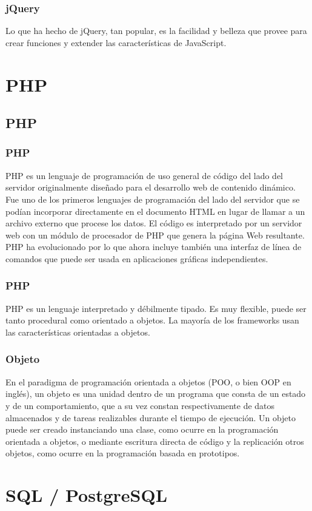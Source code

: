\documentclass[12pt]{beamer}
\begin{document}
\begin{frame}
 \frametitle{jQuery}
 Lo que ha hecho de jQuery, tan popular, es la facilidad y belleza que provee para crear funciones y extender las características de JavaScript.
\end{frame}


\section{PHP}

\subsection{PHP}

\begin{frame}
 \frametitle{PHP}
 PHP es un lenguaje de programación de uso general de código del lado del servidor originalmente diseñado para el desarrollo web de contenido dinámico. Fue uno de los primeros lenguajes de programación del lado del servidor que se podían incorporar directamente en el documento HTML en lugar de llamar a un archivo externo que procese los datos. El código es interpretado por un servidor web con un módulo de procesador de PHP que genera la página Web resultante. PHP ha evolucionado por lo que ahora incluye también una interfaz de línea de comandos que puede ser usada en aplicaciones gráficas independientes.
\end{frame}

\begin{frame}
 \frametitle{PHP}
 PHP es un lenguaje interpretado y débilmente tipado. Es muy flexible, puede ser tanto procedural como orientado a objetos. La mayoría de los frameworks usan las características orientadas a objetos.
\end{frame}

\begin{frame}
 \frametitle{Objeto}
 En el paradigma de programación orientada a objetos (POO, o bien OOP en inglés), un objeto es una unidad dentro de un programa que consta de un estado y de un comportamiento, que a su vez constan respectivamente de datos almacenados y de tareas realizables durante el tiempo de ejecución. Un objeto puede ser creado instanciando una clase, como ocurre en la programación orientada a objetos, o mediante escritura directa de código y la replicación otros objetos, como ocurre en la programación basada en prototipos.
\end{frame}

\section{SQL / PostgreSQL}
\end{document}
